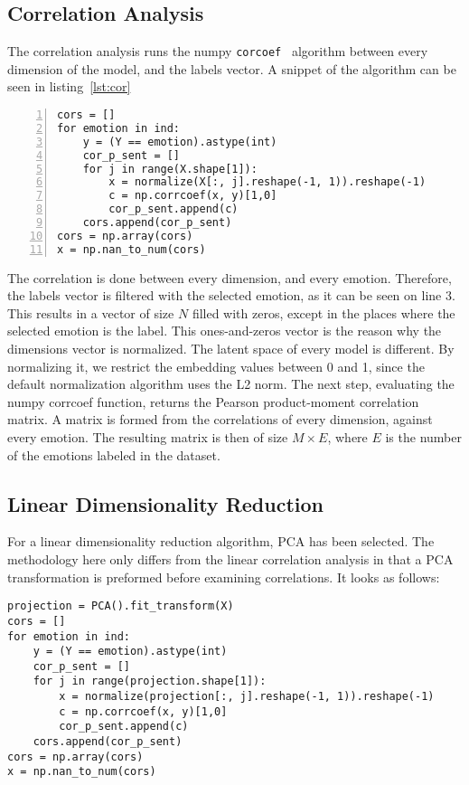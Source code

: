 \subsection{Correlation Analysis}\label{sub:Correlation Analysis Method}
The correlation analysis runs the numpy \lstinline{corcoef}~\cite{oliphant2006numpy} algorithm between every dimension of the model, and the labels vector. A snippet of the algorithm can be seen in listing~\ref{lst:cor}

\begin{lstlisting}[caption={Correlation Algorithm},label=lst:cor,frame=single,numbers=left]
cors = []
for emotion in ind:
    y = (Y == emotion).astype(int)
    cor_p_sent = []
    for j in range(X.shape[1]):
        x = normalize(X[:, j].reshape(-1, 1)).reshape(-1)
        c = np.corrcoef(x, y)[1,0]
        cor_p_sent.append(c)
    cors.append(cor_p_sent)
cors = np.array(cors)
x = np.nan_to_num(cors)
\end{lstlisting}

The correlation is done between every dimension, and every emotion. Therefore, the labels vector is filtered with the selected emotion, as it can be seen on line 3. This results in a vector of size $N$ filled with zeros, except in the places where the selected emotion is the label. This ones-and-zeros vector is the reason why the dimensions vector is normalized. The latent space of every model is different. By normalizing it, we restrict the embedding values between 0 and 1, since the default normalization algorithm uses the L2 norm.
The next step, evaluating the numpy corrcoef function, returns the Pearson product-moment correlation matrix.
A matrix is formed from the correlations of every dimension, against every emotion. The resulting matrix is then of size $M \times E$, where $E$ is the number of the emotions labeled in the dataset.


\subsection{Linear Dimensionality Reduction}\label{sub:Linear Dimentionality Reduction}
For a linear dimensionality reduction algorithm, PCA has been selected. The methodology here only differs from the linear correlation analysis in that a PCA transformation is preformed before examining correlations. It looks as follows:

\begin{lstlisting}[caption={PCA correlation Algorithm},label=lst:pca,frame=single]
projection = PCA().fit_transform(X)
cors = []
for emotion in ind:
    y = (Y == emotion).astype(int)
    cor_p_sent = []
    for j in range(projection.shape[1]):
        x = normalize(projection[:, j].reshape(-1, 1)).reshape(-1)
        c = np.corrcoef(x, y)[1,0]
        cor_p_sent.append(c)
    cors.append(cor_p_sent)
cors = np.array(cors)
x = np.nan_to_num(cors)
\end{lstlisting}


